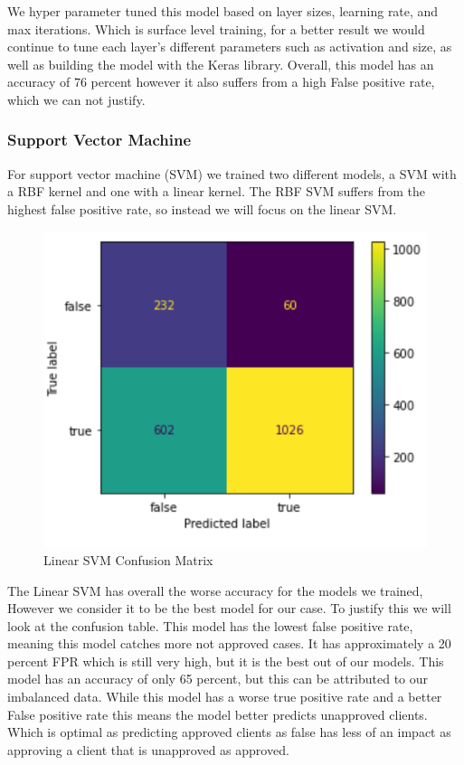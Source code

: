 \documentclass[12pt]{article}
\begin{document}
\noindent We hyper parameter tuned this model based on layer sizes, learning rate, and max iterations. Which is surface level training, for a better result we would continue to tune each layer's different parameters such as activation and size, as well as building the model with the Keras library. Overall, this model has an accuracy of 76 percent however it also suffers from a high False positive rate, which we can not justify. \\

\subsubsection{Support Vector Machine}

\noindent For support vector machine (SVM) we trained two different models, a SVM with a RBF kernel and one with a linear kernel. The RBF SVM suffers from the highest false positive rate, so instead we will focus on the linear SVM.\\

\begin{figure}
    \centering
    \includegraphics[scale = .30]{figures/LSVMconf.png} 
    \caption{Linear SVM Confusion Matrix}
\end{figure}

\noindent The Linear SVM has overall the worse accuracy for the models we trained, However we consider it to be the best model for our case. To justify this we will look at the confusion table. This model has the lowest false positive rate, meaning this model catches more not approved cases. It has approximately a 20 percent FPR which is still very high, but it is the best out of our models. This model has an accuracy of only 65 percent, but this can be attributed to our imbalanced data. While this model has a worse true positive rate and a better False positive rate this means the model better predicts unapproved clients. Which is optimal as predicting approved clients as false has less of an impact as approving a client that is unapproved as approved.\\ 
\end{document}
